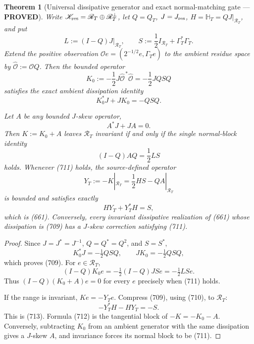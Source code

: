 \documentclass[11pt]{article}
\newtheorem{theorem}{Theorem}
\newcommand{\PROVED}{\textcolor{green!45!black}{\textbf{PROVED}}}
\begin{document}
\begin{theorem}[Universal dissipative generator and exact normal-matching
gate --- \PROVED]
Write \(\mathscr K_{\rm res}=\mathscr R_T\oplus\mathscr R_T^\perp\), let
\(Q=Q_T\), \(J=J_{\rm res}\), \(H=\mathbb H_T=QJ|_{\mathscr R_T}\), and
put
\[
 L:=(I-Q)J|_{\mathscr R_T},\qquad
 S:=\frac12I_{\mathscr R_T}+\Gamma_T^*\Gamma_T.
\]
Extend the positive observation
\(\mathcal Oe=(2^{-1/2}e,\Gamma_Te)\) to the ambient residue space by
\(\widehat{\mathcal O}:=\mathcal OQ\).  Then the bounded operator
\begin{equation}
 K_0:=-\frac12J\widehat{\mathcal O}^{\,*}
                   \widehat{\mathcal O}
     =-\frac12JQSQ                                \tag{708}
\end{equation}
satisfies the exact ambient dissipation identity
\begin{equation}
 \boxed{K_0^*J+JK_0=-QSQ.}                         \tag{709}
\end{equation}

Let \(A\) be any bounded \(J\)-skew operator,
\begin{equation}
 A^*J+JA=0.                                        \tag{710}
\end{equation}
Then \(K:=K_0+A\) leaves \(\mathscr R_T\) invariant if and only if the
single normal-block identity
\begin{equation}
 \boxed{(I-Q)AQ=\frac12LS}                         \tag{711}
\end{equation}
holds.  Whenever (711) holds, the source-defined operator
\begin{equation}
 Y_T:=-K|_{\mathscr R_T}
     =\frac12HS-QA|_{\mathscr R_T}                 \tag{712}
\end{equation}
is bounded and satisfies exactly
\begin{equation}
 HY_T+Y_T^*H=S,                                    \tag{713}
\end{equation}
which is (661).  Conversely, every invariant dissipative realization of
(661) whose dissipation is (709) has a \(J\)-skew correction satisfying
(711).
\end{theorem}

\begin{proof}
Since \(J=J^*=J^{-1}\), \(Q=Q^*=Q^2\), and \(S=S^*\),
\[
 K_0^*J=-\tfrac12QSQ,\qquad
 JK_0=-\tfrac12QSQ,
\]
which proves (709).  For \(e\in\mathscr R_T\),
\[
 (I-Q)K_0e=-\tfrac12(I-Q)JSe=-\tfrac12LSe.
\]
Thus \((I-Q)(K_0+A)e=0\) for every \(e\) precisely when (711) holds.

If the range is invariant, \(Ke=-Y_Te\).  Compress (709), using (710), to
\(\mathscr R_T\):
\[
 -Y_T^*H-HY_T=-S.
\]
This is (713).  Formula (712) is the tangential block of
\(-K=-K_0-A\).  Conversely, subtracting \(K_0\) from an ambient generator
with the same dissipation gives a \(J\)-skew \(A\), and invariance forces
its normal block to be (711).
\end{proof}
\end{document}
